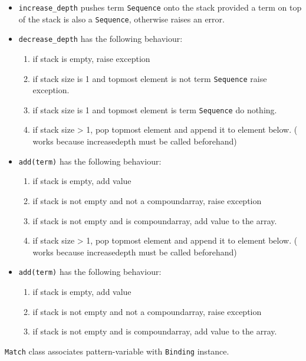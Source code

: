 \begin{itemize}
\item 
\texttt{increase\_depth} pushes term \texttt{Sequence} onto the stack provided a term on top of the stack is also a \texttt{Sequence}, otherwise raises an error.

\item
\texttt{decrease\_depth} has the following behaviour:
	\begin{enumerate}
		\item
        if stack is empty, raise exception
		\item
		if stack size is 1 and topmost element is not term \texttt{Sequence} raise exception.
		\item
		if stack size is 1 and topmost element is term \texttt{Sequence} do nothing.
		\item
        if stack size > 1, pop topmost element and append it to element below. ( works because increasedepth must be called beforehand)
	\end{enumerate}

\item
\texttt{add(term)} has the following behaviour:
	\begin{enumerate}
		\item
         if stack is empty, add value
		\item
         if stack is not empty and not a compoundarray, raise exception
		\item
        if stack is not empty and is compoundarray, add value to the array.
		\item
        if stack size > 1, pop topmost element and append it to element below. ( works because increasedepth must be called beforehand)
	\end{enumerate}

\item
\texttt{add(term)} has the following behaviour:
	\begin{enumerate}
		\item
         if stack is empty, add value
		\item
         if stack is not empty and not a compoundarray, raise exception
		\item
        if stack is not empty and is compoundarray, add value to the array.
	\end{enumerate}
\end{itemize}



\texttt{Match} class associates pattern-variable with \texttt{Binding} instance.

